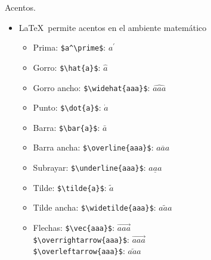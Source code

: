 \documentclass[dvipsnames,xcolor, handout]{beamer}
\theoremstyle{plain}
\theoremstyle{definition}
\begin{document}
\begin{frame}[fragile]{Acentos.}
    \begin{itemize}
        \item \LaTeX\ permite acentos en el ambiente matemático
        \begin{itemize}
            \item Prima: \verb!$a^\prime$!: $a^\prime$\pause
            \item Gorro: \verb!$\hat{a}$!: $\hat{a}$
            \item Gorro ancho: \verb!$\widehat{aaa}$!: $\widehat{aaa}$\pause
            \item Punto: \verb!$\dot{a}$!: $\dot{a}$\pause
            \item Barra: \verb!$\bar{a}$!: $\bar{a}$
            \item Barra ancha: \verb!$\overline{aaa}$!: $\overline{aaa}$
            \item Subrayar:  \verb!$\underline{aaa}$!: $\underline{aaa}$\pause
            \item Tilde: \verb!$\tilde{a}$!: $\tilde{a}$
            \item Tilde ancha: \verb!$\widetilde{aaa}$!: $\widetilde{aaa}$\pause
            \item Flechas:
            \verb!$\vec{aaa}$!: $\vec{aaa}$\\
            \hspace{1.3cm}\verb!$\overrightarrow{aaa}$!: $\overrightarrow{aaa}$\\
            \hspace{1.3cm}\verb!$\overleftarrow{aaa}$!: $\overleftarrow{aaa}$
        \end{itemize}
    \end{itemize}
\end{frame}
\end{document}
